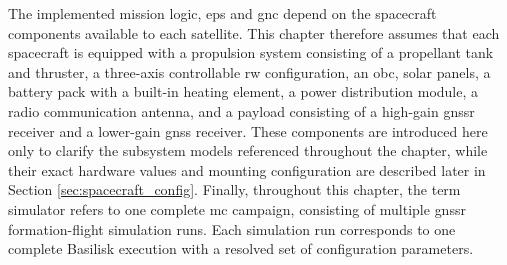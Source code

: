 The implemented mission logic, \gls{eps} and \gls{gnc} depend on the spacecraft components available to each satellite. This chapter therefore assumes that each spacecraft is equipped with a propulsion system consisting of a propellant tank and thruster, a three-axis controllable \gls{rw} configuration, an \gls{obc}, solar panels, a battery pack with a built-in heating element, a power distribution module, a radio communication antenna, and a payload consisting of a high-gain \gls{gnssr} receiver and a lower-gain \gls{gnss} receiver. These components are introduced here only to clarify the subsystem models referenced throughout the chapter, while their exact hardware values and mounting configuration are described later in Section \ref{sec:spacecraft_config}. Finally, throughout this chapter, the term simulator refers to one complete \gls{mc} campaign, consisting of multiple \gls{gnssr} formation-flight simulation runs. Each simulation run corresponds to one complete Basilisk execution with a resolved set of configuration parameters.

